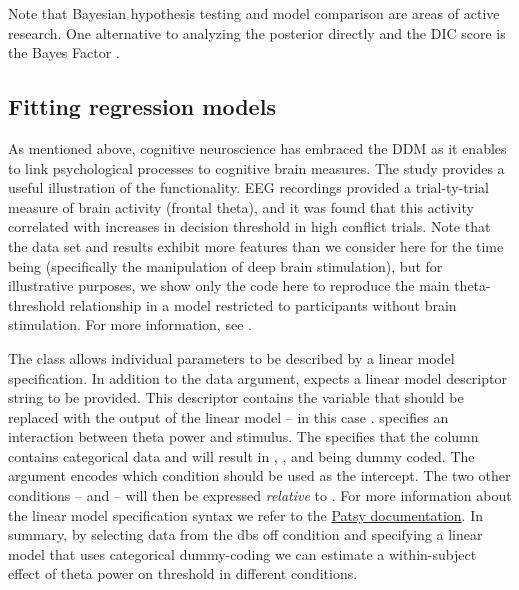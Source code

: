 \documentclass[letterpaper,10pt,english]{article}
\begin{document}
Note that Bayesian hypothesis testing and model comparison are areas
of active research.  One alternative to analyzing the posterior
directly and the DIC score is the Bayes Factor
\citep[e.g.][]{WagenmakersLodewyckxKuriyalEtAl10}.

\subsection*{Fitting regression models}
\label{demo:fitting-regression-models}
As mentioned above, cognitive neuroscience has embraced the DDM as it
enables to link psychological processes to cognitive brain measures.
The \citet{CavanaghWieckiCohenEtAl11} study provides a useful
illustration of the functionality. EEG recordings provided a
trial-ty-trial measure of brain activity (frontal theta), and it was
found that this activity correlated with increases in decision
threshold in high conflict trials. Note that the data set and results
exhibit more features than we consider here for the time being
(specifically the manipulation of deep brain stimulation), but for
illustrative purposes, we show only the code here to reproduce the main theta-threshold relationship in a model restricted to participants without brain stimulation. For more information, see
\citet{CavanaghWieckiCohenEtAl11}.

The  class allows individual parameters to be described by a linear model specification. In addition to the data argument,  expects a linear model descriptor string to be provided. This descriptor contains the  variable that should be replaced with the output of the linear model -- in this case .  specifies an interaction between theta power and stimulus. The  specifies that the  column contains categorical data and will result in , , and  being dummy coded. The  argument encodes which condition should be used as the intercept. The two other conditions --  and  -- will then be expressed \textit{relative} to . For more information about the linear model specification syntax we refer to the \href{http://patsy.readthedocs.org/en/latest/}{Patsy documentation}. In summary, by selecting data from the dbs off condition and specifying a linear model that uses categorical dummy-coding we can estimate a within-subject effect of theta power on threshold in different conditions.

\end{document}

